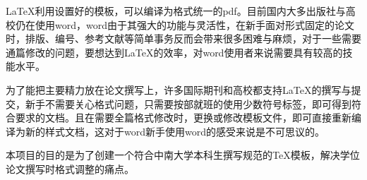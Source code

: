 \begin{abstractcn}

LaTeX利用设置好的模板，可以编译为格式统一的pdf。目前国内大多出版社与高校仍在使用word，word由于其强大的功能与灵活性，在新手面对形式固定的论文时，排版、编号、参考文献等简单事务反而会带来很多困难与麻烦，对于一些需要通篇修改的问题，要想达到LaTeX的效率，对word使用者来说需要具有较高的技能水平。

为了能把主要精力放在论文撰写上，许多国际期刊和高校都支持LaTeX的撰写与提交，新手不需要关心格式问题，只需要按部就班的使用少数符号标签，即可得到符合要求的文档。且在需要全篇格式修改时，更换或修改模板文件，即可直接重新编译为新的样式文档，这对于word新手使用word的感受来说是不可思议的。

本项目的目的是为了创建一个符合中南大学本科生撰写规范的TeX模板，解决学位论文撰写时格式调整的痛点。


\end{abstractcn}